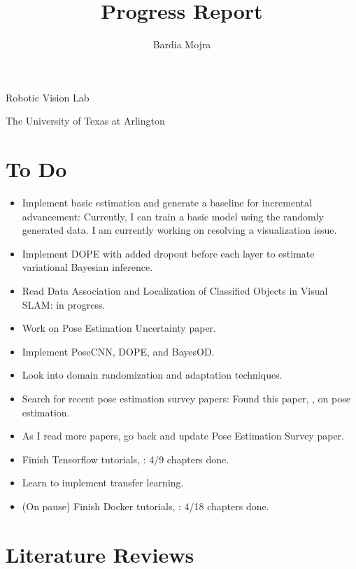 \documentclass[11pt]{article}
\title{Progress Report}
\author{Bardia Mojra}
\begin{document}
\maketitle
\thispagestyle{empty}

\bigskip
\bigskip
\begin{center}
	Robotic Vision Lab
\end{center}

\begin{center}
	The University of Texas at Arlington
\end{center}

\newpage

\section{To Do}
\begin{itemize}
	\item Implement basic estimation and generate a baseline for incremental
	      advancement: Currently, I can train a basic model using  the randomly
	      generated data. I am currently working on resolving a visualization
	      issue.
	\item Implement DOPE with added dropout before each layer to estimate
	      variational Bayesian inference.
	\item Read Data Association and Localization of Classified Objects in Visual
	      SLAM: in progress.
	\item Work on Pose Estimation Uncertainty paper.
	\item Implement PoseCNN, DOPE, and BayesOD.
	\item Look into domain randomization and adaptation techniques.
	\item Search for recent pose estimation survey papers: Found this paper,
	      \cite{du2020vision}, on pose estimation.
	\item As I read more papers, go back and update Pose Estimation Survey paper.
	\item Finish Tensorflow tutorials, \cite{CVTF2}: 4/9 chapters done.
	\item Learn to implement transfer learning.
	\item (On pause) Finish Docker tutorials, \cite{schenker2020learn}: 4/18
	      chapters done.
\end{itemize}

\section{Literature Reviews}
\end{document}
